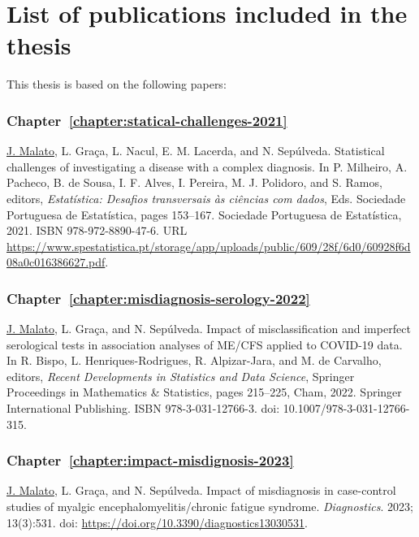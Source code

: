 \section*{List of publications included in the thesis}

This thesis is based on the following papers:

\subsubsection{Chapter~\ref{chapter:statical-challenges-2021}}
\vspace{-1em}
\noindent\underline{J. Malato}, L. Graça, L. Nacul, E. M. Lacerda, and N. Sepúlveda. Statistical challenges of investigating a disease with a complex diagnosis. In P. Milheiro, A. Pacheco, B. de Sousa, I. F. Alves, I. Pereira, M. J. Polidoro, and S. Ramos, editors, \textit{Estatística: Desafios transversais às ciências com dados}, Eds. Sociedade Portuguesa de Estatística, pages 153--167. Sociedade Portuguesa de Estatística, 2021. ISBN 978-972-8890-47-6. URL \url{https://www.spestatistica.pt/storage/app/uploads/public/609/28f/6d0/60928f6d08a0c016386627.pdf}.

\subsubsection{Chapter~\ref{chapter:misdiagnosis-serology-2022}}
\vspace{-1em}
\noindent\underline{J. Malato}, L. Graça, and N. Sepúlveda. Impact of misclassification and imperfect serological tests in association analyses of ME/CFS applied to COVID-19 data. In R. Bispo, L. Henriques-Rodrigues, R. Alpizar-Jara, and M. de Carvalho, editors, \textit{Recent Developments in Statistics and Data Science}, Springer Proceedings in Mathematics \& Statistics, pages 215--225, Cham, 2022. Springer International Publishing. ISBN 978-3-031-12766-3. doi: 10.1007/978-3-031-12766-315.

\subsubsection{Chapter~\ref{chapter:impact-misdignosis-2023}}
\vspace{-1em}
\noindent\underline{J. Malato}, L. Graça, and N. Sepúlveda. Impact of misdiagnosis in case-control studies of myalgic encephalomyelitis/chronic fatigue syndrome. \textit{Diagnostics}. 2023; 13(3):531. doi: \url{https://doi.org/10.3390/diagnostics13030531}.

